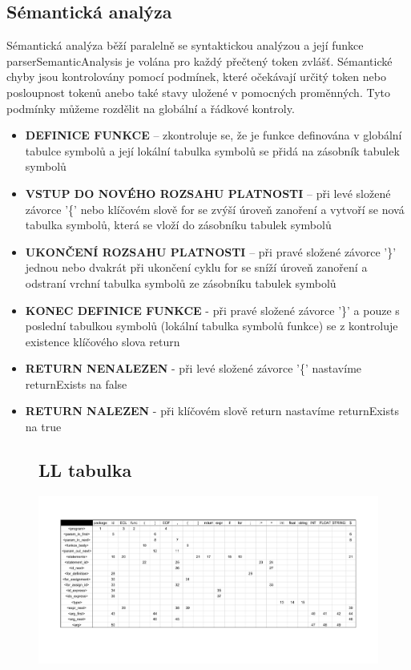 \documentclass[a4paper, 12pt]{article}
\def\fillandplacepagenumber{%
 \par\pagestyle{empty}%
 \vbox to 0pt{\vss}\vfill
 \vbox to 0pt{\baselineskip0pt
   \hbox to\linewidth{\hss}%
   \baselineskip\footskip
   \hbox to\linewidth{%
     \hfil\thepage\hfil}\vss}}
\begin{document}
\subsection{Sémantická analýza}
Sémantická analýza běží paralelně se syntaktickou analýzou a její funkce parserSemanticAnalysis je volána pro každý přečtený token zvlášť. Sémantické chyby jsou kontrolovány pomocí podmínek, které očekávají určitý token nebo posloupnost tokenů anebo také stavy uložené v pomocných proměnných. Tyto podmínky můžeme rozdělit na globální a řádkové kontroly.
\begin{itemize}
    \item \textbf{DEFINICE FUNKCE} – zkontroluje se, že je funkce definována v globální tabulce symbolů a její lokální tabulka symbolů se přidá na zásobník tabulek symbolů
    \item \textbf{VSTUP DO NOVÉHO ROZSAHU PLATNOSTI} – při levé složené závorce '\{' nebo klíčovém slově for se zvýší úroveň zanoření a vytvoří se nová tabulka symbolů, která se vloží do zásobníku tabulek symbolů
    \item \textbf{UKONČENÍ ROZSAHU PLATNOSTI} – při pravé složené závorce '\}' jednou nebo dvakrát při ukončení cyklu for se sníží úroveň zanoření a odstraní vrchní tabulka symbolů ze zásobníku tabulek symbolů
    \item \textbf{KONEC DEFINICE FUNKCE} - při pravé složené závorce '\}' a pouze s poslední tabulkou symbolů (lokální tabulka symbolů funkce) se z kontroluje existence klíčového slova return
    \item \textbf{RETURN NENALEZEN} - při levé složené závorce '\{' nastavíme returnExists na false
    \item \textbf{RETURN NALEZEN} - při klíčovém slově return nastavíme returnExists na true
\end{itemize}


\begin{landscape}
\pagestyle{empty}
\begin{figure}[h]
\subsection{LL tabulka}
\hspace*{-3.6cm}\vspace*{+1cm}\includegraphics[width=1.85\textwidth,keepaspectratio]{LL_table.pdf}
\end{figure}
\end{landscape}
\end{document}
